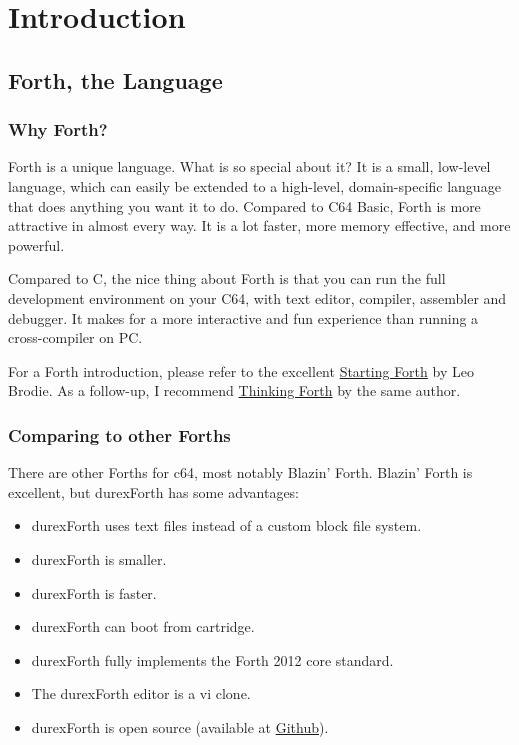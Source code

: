 \chapter{Introduction}

\section{Forth, the Language}

\subsection{Why Forth?}

Forth is a unique language. What is so special about it? It is a small, low-level language, which can easily be extended to a high-level, domain-specific language that does anything you want it to do. Compared to C64 Basic, Forth is more attractive in almost every way. It is a lot faster, more memory effective, and more powerful.

Compared to C, the nice thing about Forth is that you can run the full development environment on your C64,
with text editor, compiler, assembler and debugger. It makes for a more interactive and fun experience than running a cross-compiler on PC.

For a Forth introduction, please refer to the excellent
\href{http://www.forth.com/starting-forth/}{Starting Forth} by Leo Brodie. As a follow-up, I
recommend \href{http://thinking-forth.sourceforge.net/}{Thinking Forth} by the same author.

\subsection{Comparing to other Forths}

There are other Forths for c64, most notably Blazin' Forth. Blazin' Forth is excellent, but durexForth has some advantages:

\begin{itemize}
\item durexForth uses text files instead of a custom block file system.
\item durexForth is smaller.
\item durexForth is faster.
\item durexForth can boot from cartridge.
\item durexForth fully implements the Forth 2012 core standard.
\item The durexForth editor is a vi clone.
\item durexForth is open source (available at \href{https://github.com/jkotlinski/durexforth}{Github}).
\end{itemize}

